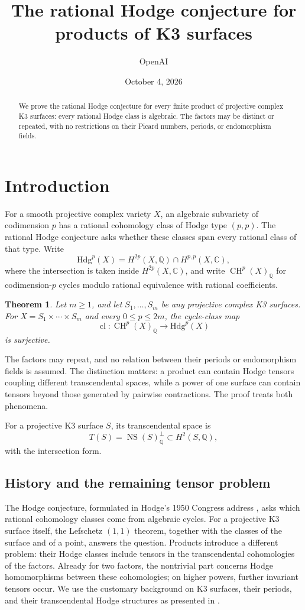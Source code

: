 \documentclass[11pt]{article}
\title{The rational Hodge conjecture for products of K3 surfaces}
\author{OpenAI}
\date{October 4, 2026}
\numberwithin{equation}{section}
\newtheorem{theorem}{Theorem}[section]
\theoremstyle{definition}
\theoremstyle{remark}
\newcommand{\Q}{\mathbb Q}
\newcommand{\C}{\mathbb C}
\DeclareMathOperator{\NS}{NS}
\DeclareMathOperator{\CH}{CH}
\DeclareMathOperator{\cl}{cl}
\newcommand{\Hdg}{\mathrm{Hdg}}
\begin{document}
\maketitle
\begin{abstract}
We prove the rational Hodge conjecture for every finite product of projective
complex K3 surfaces: every rational Hodge class is algebraic.  The factors
may be distinct or repeated, with no restrictions on their Picard numbers,
periods, or endomorphism fields.
\end{abstract}
\tableofcontents

\section{Introduction}\label{sec:introduction}

For a smooth projective complex variety \(X\), an algebraic subvariety
of codimension \(p\) has a rational cohomology class of Hodge type
\((p,p)\).  The rational Hodge conjecture asks whether these classes
span every rational class of that type.  Write
\[
 \Hdg^p(X)=H^{2p}(X,\Q)\cap H^{p,p}(X,\C),
\]
where the intersection is taken inside \(H^{2p}(X,\C)\), and write
\(\CH^p(X)_\Q\) for codimension-\(p\) cycles modulo rational
equivalence with rational coefficients.

\begin{theorem}\label{thm:main}
Let \(m\ge1\), and let \(S_1,\ldots,S_m\) be any projective complex
K3 surfaces.  For \(X=S_1\times\cdots\times S_m\) and every
\(0\le p\le2m\), the cycle-class map
\[
 \cl:\CH^p(X)_\Q\longrightarrow\Hdg^p(X)
\]
is surjective.
\end{theorem}

The factors may repeat, and no relation between their periods or
endomorphism fields is assumed.  The distinction matters: a product
can contain Hodge tensors coupling different transcendental spaces,
while a power of one surface can contain tensors beyond those generated
by pairwise contractions.  The proof treats both phenomena.

For a projective K3 surface \(S\), its transcendental space is
\[
 T(S)=\NS(S)_\Q^\perp\subset H^2(S,\Q),
\]
with the intersection form.  

\subsection{History and the remaining tensor problem}
The Hodge conjecture, formulated in Hodge's 1950 Congress address
\cite{Hodge1952}, asks which rational cohomology classes come from algebraic
cycles.  For a projective K3 surface itself, the Lefschetz $(1,1)$ theorem,
together with the classes of the surface and of a point, answers the question.
Products introduce a different problem: their Hodge classes include tensors
in the transcendental cohomologies of the factors.  Already for two factors,
the nontrivial part concerns Hodge homomorphisms between these cohomologies;
on higher powers, further invariant tensors occur.  We use the customary
background on K3 surfaces, their periods, and their transcendental Hodge
structures as presented in \cite{HuybrechtsK3}.
\end{document}
